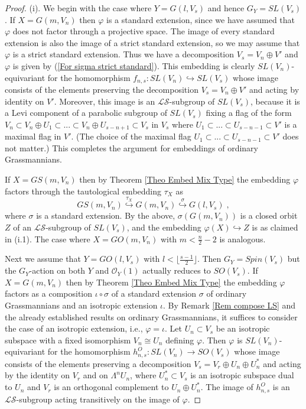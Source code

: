 \documentclass[12pt]{amsart}
\def\hw  {\hookrightarrow}
\def\mc {\mathcal}
\begin{document}
\begin{proof}
(i). We begin with the case where $Y= G(l,V_s)$ and hence $G_Y=SL(V_s)$. If $X= G(m,V_n)$ then $\varphi$ is a standard extension, since we have assumed that $\varphi$ does not factor through a projective space. The image of every standard extension is also the image of a strict standard extension, so we may assume that $\varphi$ is a strict standard extension. Thus we have a decomposition $V_s=V_n \oplus V'$ and $\varphi$ is given by (\ref{For sigma strict standard}). This embedding is clearly $SL(V_n)$-equivariant for the homomorphism $f_{n,s}:SL(V_n)\hw SL(V_s)$ whose image consists of the elements preserving the decomposition $V_s=V_n \oplus V'$ and acting by identity on $V'$. Moreover, this image is an $\mc{LS}$-subgroup of $SL(V_s)$, because it is a Levi component of a parabolic subgroup of $SL(V_s)$ fixing a flag of the form $V_{n}\subset V_{n}\oplus U_1\subset ...\subset V_n\oplus U_{s-n+1}\subset V_s$ in $V_s$ where $U_1\subset...\subset U_{s-n-1}\subset V'$ is a maximal flag in $V'$. (The choice of the maximal flag $U_1\subset...\subset U_{s-n-1}\subset V'$ does not matter.) This completes the argument for embeddings of ordinary Grassmannians.

If $X=GS(m,V_n)$ then by Theorem \ref{Theo Embed Mix Type} the embedding $\varphi$ factors through the tautological embedding $\tau_X$ as
$$
GS(m,V_n) \stackrel{\tau_X}{\hw} G(m,V_n) \stackrel{\sigma}{\hw} G(l,V_s)\;,
$$
where $\sigma$ is a standard extension. By the above, $\sigma(G(m,V_n))$ is a closed orbit $Z$ of an $\mc{LS}$-subgroup of $SL(V_s)$, and the embedding $\varphi(X)\hw Z$ is as claimed in (i.1). The case where $X= GO(m,V_n)$ with $m<\frac{n}{2}-2$ is analogous.

Next we assume that $Y= GO(l,V_s)$ with $l<\lfloor\frac{s-1}{2}\rfloor$. Then $G_Y=Spin(V_s)$ but the $G_Y$-action on both $Y$ and $\mc O_Y(1)$ actually reduces to $SO(V_s)$. If $X= G(m,V_n)$ then by Theorem \ref{Theo Embed Mix Type} the embedding $\varphi$ factors as a composition $\iota\circ\sigma$ of a standard extension $\sigma$ of ordinary Grassmannians and an isotropic extension $\iota$. By Remark \ref{Rem compose LS} and the already established results on ordinary Grassmannians, it suffices to consider the case of an isotropic extension, i.e., $\varphi=\iota$. Let $U_n\subset V_{s}$ be an isotropic subspace with a fixed isomorphism $V_n\cong U_n$ defining $\varphi$. Then $\varphi$ is $SL(V_n)$-equivariant for the homomorphism $h^O_{n,s}:SL(V_n)\to SO(V_s)$ whose image consists of the elements preserving a decomposition $V_s=V_{r}\oplus U_n\oplus U_n^*$ and acting by the identity on $V_{r}$ and on $\Lambda^n U_n$, where $U_n^*\subset V_s$ is an isotropic subspace dual to $U_n$ and $V_r$ is an orthogonal complement to $U_n\oplus U_n^*$. The image of $h^O_{n,s}$ is an $\mc{LS}$-subgroup acting transitively on the image of $\varphi$.


\end{proof}
\end{document}
